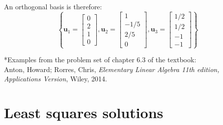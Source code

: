 \documentclass{article}
\begin{document}
\begin{description}
An orthogonal basis is therefore:
\[\left\{\mathbf{u}_1 = \begin{bmatrix} 0 \\ 2 \\ 1 \\ 0 \end{bmatrix}, \mathbf{u}_2 = \begin{bmatrix} 1 \\ -1/5 \\ 2/5 \\ 0 \end{bmatrix}, \mathbf{u}_3 = \begin{bmatrix} 1/2 \\ 1/2 \\ -1 \\ -1 \end{bmatrix}\right\}\]
\end{description}
*Examples from the problem set of chapter 6.3 of the textbook: \\
Anton, Howard; Rorres, Chris, \emph{Elementary Linear Algebra 11th edition, Applications Version}, Wiley, 2014.



\section*{Least squares solutions}
\end{document}
